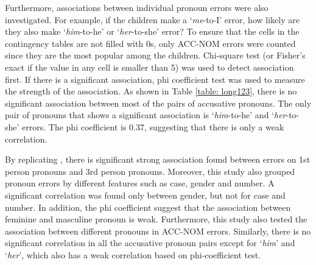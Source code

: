 Furthermore, associations between individual pronoun errors were also investigated. For example, if the children make a `\textit{me}-to-I' error, how likely are they also make `\textit{him}-to-he' or `\textit{her}-to-she' error?  To ensure that the cells in the contingency tables are not filled with 0s, only ACC-NOM errors were counted since they are the most popular among the children. Chi-square test (or Fisher's exact if the value in any cell is smaller than 5) was used to detect association first. If there is a significant association, phi coefficient test was used to measure the strength of the association. As shown in Table \ref{table: long123}, there is no significant association between most of the pairs of accusative pronouns. The only pair of pronouns that shows a significant association is `\textit{him}-to-he' and `\textit{her}-to-she' errors. The phi coefficient is 0.37, suggesting that there is only a weak correlation. 

By replicating \cite{fitzgerald2017case}, there is significant strong association found between errors on 1st person pronouns and 3rd person pronouns. Moreover, this study also grouped pronoun errors by different features such as case, gender and number. A significant correlation was found only between gender, but not for case and number. In addition, the phi coefficient suggest that the association between feminine and masculine pronoun is weak. Furthermore, this study also tested the association between different pronouns in ACC-NOM errors. Similarly, there is no significant correlation in all the accusative pronoun pairs except for `\textit{him}' and `\textit{her}', which also has a weak correlation based on phi-coefficient test. 

